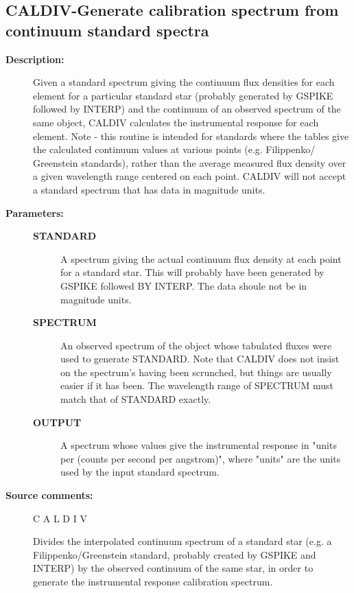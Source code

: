 \subsection{CALDIV-\label{CALDIV}Generate calibration spectrum from continuum standard spectra}
\begin{description}

\item [\textbf{Description:}]
 Given a standard spectrum giving the continuum flux densities
 for each element for a particular standard star (probably
 generated by GSPIKE followed by INTERP) and the continuum
 of an observed spectrum of the same object, CALDIV calculates
 the instrumental response for each element.  Note - this
 routine is intended for standards where the tables give the
 calculated continuum values at various points (e.g. Filippenko/
 Greenstein standards), rather than the average measured flux
 density over a given wavelength range centered on each point.
 CALDIV will not accept a standard spectrum that has data in
 magnitude units.

\item [\textbf{Parameters:}]
\begin{description}
\item [\textbf{STANDARD}]
 A spectrum giving the actual continuum flux density at each
 point for a standard star.  This will probably have been
 generated by GSPIKE followed BY INTERP.  The data shoule not
 be in magnitude units.
\item [\textbf{SPECTRUM}]
 An observed spectrum of the object whose tabulated fluxes
 were used to generate STANDARD.  Note that CALDIV does not
 insist on the spectrum's having been scrunched, but things
 are usually easier if it has been.  The wavelength range of
 SPECTRUM must match that of STANDARD exactly.
\item [\textbf{OUTPUT}]
 A spectrum whose values give the instrumental response in
 "units per (counts per second per angstrom)", where "units"
 are the units used by the input standard spectrum.
\end{description}

\item [\textbf{Source comments:}]
\begin{terminalv}
 C A L D I V

 Divides the interpolated continuum spectrum of a standard
 star (e.g. a Filippenko/Greenstein standard, probably created
 by GSPIKE and INTERP) by the observed continuum of the same
 star, in order to generate the instrumental response calibration
 spectrum.


\end{terminalv}
\end{description}
